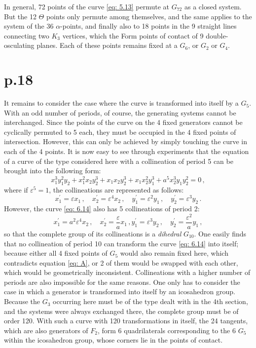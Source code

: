 \documentclass[leqno]{article}
\begin{document}
In general, 72 points of the curve \eqref{eq: 5.13} permute at $G_{72}$ as a closed system. But the 12 $\Theta$ points only permute among themselves, and the same applies to the system of the 36 $\alpha$-points, and finally also to 18 points in the 9 straight lines connecting two $K_3$ vertices, which the Form points of contact of 9 double-osculating planes. Each of these points remains fixed at a $G_6$, or $G_2$ or $G_4$. 
\section{p.18}
It remains to consider the case where the curve is transformed into itself by a $G_5$. With an odd number of periods, of course, the generating systems cannot be interchanged. Since the points of the curve on the 4 fixed generators cannot be cyclically permuted to 5 each, they must be occupied in the 4 fixed points of intersection. However, this can only be achieved by simply touching the curve in each of the 4 points. It is now easy to see through experiments that the equation of a curve of the type considered here with a collineation of period 5 can be brought into the following form: 
\begin{equation}\label{eq: 6.14}
x_1^3 y_1^2 y_2 + x_1^2 x_2 y_2^3 + x_1 x_2 y_2^3 + x_1 x_2^2 y_1^3 + a^5 x_2^3 y_1 y_2^2 = 0 \, , \tag{14}
\end{equation}
where if $\varepsilon^5=1 $, the collineations are represented as follows:
\[
x_1^\prime = \varepsilon x_1 \, , \quad x_2^\prime = \varepsilon^4 x_2 \, , \quad y_1^\prime = \varepsilon^2 y_1 \, , \quad y_2^\prime = \varepsilon^3 y_2 \, . 
\]
However, the curve \eqref{eq: 6.14} also has 5 collineations of period 2: 
\[
x_1^\prime = a^2 \varepsilon^4 x_2 \, , \quad x_2^\prime = \frac{\varepsilon}{a} x_1 \, , y_1^\prime = \varepsilon^3 y_2 \, , \quad y_2^\prime = \frac{\varepsilon^2}{a} y_1 \, , 
\]
so that the complete group of its collineations is a \textit{dihedral} $G_{10}$. One easily finds that no collineation of period 10 can transform the curve \eqref{eq: 6.14} into itself; because either all 4 fixed points of $G_5$ would also remain fixed here, which contradicts equation \eqref{eq: A}, or 2 of them would be swapped with each other, which would be geometrically inconsistent. Collineations with a higher number of periods are also impossible for the same reasons. One only has to consider the case in which a generator is transformed into itself by an icosahedron group. Because the $G_3$ occurring here must be of the type dealt with in the 4th section, and the systems were always exchanged there, the complete group must be of order 120. With such a curve with 120 transformations in itself, the 24 tangents, which are also generators of $F_2$, form 6 quadrilaterals corresponding to the 6 $G_5$ within the icosahedron group, whose corners lie in the points of contact. \\
\end{document}
